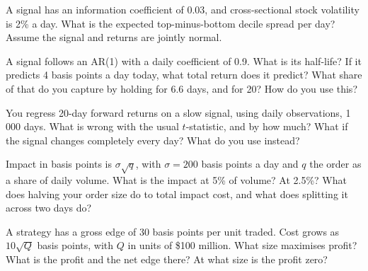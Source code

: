 \begin{question}\label{iq:iv2:research-and-strategy-cases:12}
A signal has an information coefficient of 0.03, and cross-sectional stock volatility is 2\% a day. What is the expected top-minus-bottom decile spread per day? Assume the signal and returns are jointly normal.
\end{question}

\begin{question}\label{iq:iv2:research-and-strategy-cases:13}
A signal follows an AR(1) with a daily coefficient of 0.9. What is its half-life? If it predicts 4 basis points a day today, what total return does it predict? What share of that do you capture by holding for 6.6 days, and for 20? How do you use this?
\end{question}

\begin{question}\label{iq:iv2:research-and-strategy-cases:14}
You regress 20-day forward returns on a slow signal, using daily observations, 1\,000 days. What is wrong with the usual $t$-statistic, and by how much? What if the signal changes completely every day? What do you use instead?
\end{question}

\begin{question}\label{iq:iv2:research-and-strategy-cases:15}
Impact in basis points is $\sigma\sqrt{q}$, with $\sigma = 200$ basis points a day and $q$ the order as a share of daily volume. What is the impact at 5\% of volume? At 2.5\%? What does halving your order size do to total impact cost, and what does splitting it across two days do?
\end{question}

\begin{question}\label{iq:iv2:research-and-strategy-cases:16}
A strategy has a gross edge of 30 basis points per unit traded. Cost grows as $10\sqrt{Q}$ basis points, with $Q$ in units of \$100 million. What size maximises profit? What is the profit and the net edge there? At what size is the profit zero?
\end{question}


